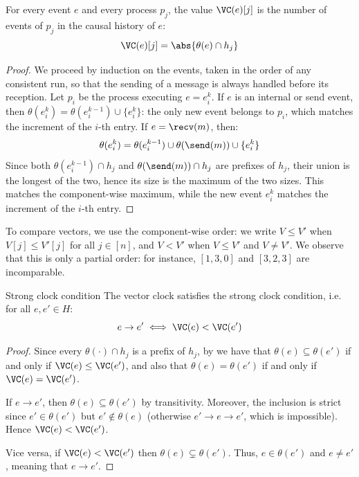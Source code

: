 \begin{framedlem}[label={lem:vc-count}]{}
  For every event $e$ and every process $p_j$, the value $\VC(e)[j]$ is the number of events of $p_j$ in the causal history of $e$:
  \[\VC(e)[j] = \abs{\theta(e) \cap h_j}\]
\end{framedlem}

\begin{proof}
  We proceed by induction on the events, taken in the order of any consistent run, so that the sending of a message is always handled before its reception. Let $p_i$ be the process executing $e = e_i^k$. If $e$ is an internal or send event, then $\theta(e_i^k) = \theta(e_i^{k-1}) \cup \{e_i^k\}$: the only new event belongs to $p_i$, which matches the increment of the $i$-th entry. If $e = \recv(m)$, then:
  \[\theta(e_i^k) = \theta(e_i^{k-1}) \cup \theta(\send(m)) \cup \{e_i^k\}\]
  Since both $\theta(e_i^{k-1}) \cap h_j$ and $\theta(\send(m)) \cap h_j$ are prefixes of $h_j$, their union is the longest of the two, hence its size is the maximum of the two sizes. This matches the component-wise maximum, while the new event $e_i^k$ matches the increment of the $i$-th entry.
\end{proof}

To compare vectors, we use the component-wise order: we write $V \leq V'$ when $V[j] \leq V'[j]$ for all $j \in [n]$, and $V < V'$ when $V \leq V'$ and $V \neq V'$. We observe that this is only a partial order: for instance, $[1,3,0]$ and $[3,2,3]$ are incomparable.

\begin{framedthm}{Strong clock condition}
  The vector clock satisfies the strong clock condition, i.e. for all $e, e' \in H$:
  \[e \to e' \iff \VC(e) < \VC(e')\]
\end{framedthm}

\begin{proof}
  Since every $\theta(\cdot) \cap h_j$ is a prefix of $h_j$, by  we have that $\theta(e) \subseteq \theta(e')$ if and only if $\VC(e) \leq \VC(e')$, and also that $\theta(e) = \theta(e')$ if and only if $\VC(e) = \VC(e')$.

  If $e \to e'$, then $\theta(e) \subseteq \theta(e')$ by transitivity. Moreover, the inclusion is strict since $e' \in \theta(e')$ but $e' \notin \theta(e)$ (otherwise $e' \to e \to e'$, which is impossible). Hence $\VC(e) < \VC(e')$.

  Vice versa, if $\VC(e) < \VC(e')$ then $\theta(e) \subsetneq \theta(e')$. Thus, $e \in \theta(e')$ and $e \neq e'$, meaning that $e \to e'$.
\end{proof}


